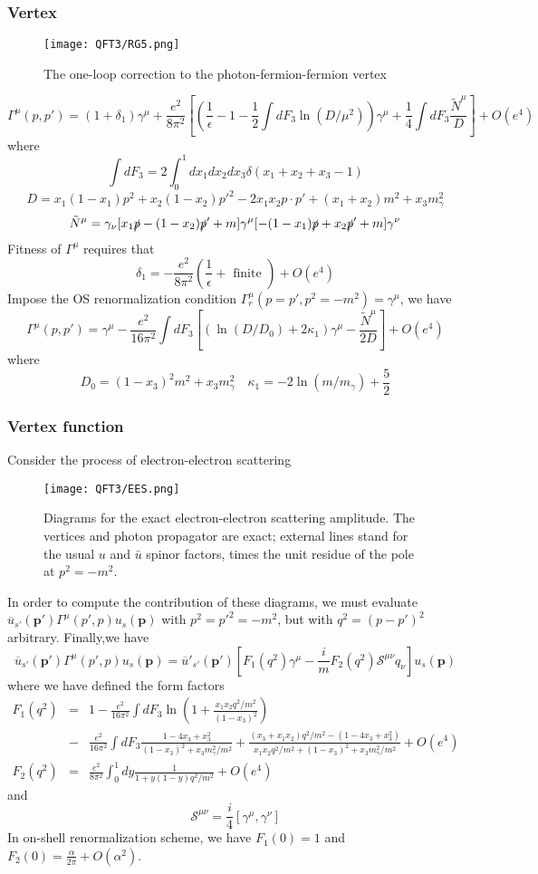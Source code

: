 \subsubsection{Vertex}
\begin{figure}[!h]
\centering
\texttt{[image: QFT3/RG5.png]}
\caption{The one-loop correction to the photon-fermion-fermion vertex}
\end{figure}
\[\Gamma^{\mu}(p,p') = (1+\delta_1)\gamma^{\mu} + \frac{e^2}{8\pi^2} \left[\left(\frac{1}{\epsilon} - 1 - \frac{1}{2} \int dF_3 \ln (D/\mu^2)\right)\gamma^{\mu} + \frac{1}{4} \int dF_3 \frac{\tilde{N}^{\mu}}{D}\right] + O(e^4)\]
where
\[\int dF_3 = 2 \int_0^1 dx_1 dx_2 dx_3 \delta(x_1+x_2+x_3-1)\]
\[D = x_1(1-x_1)p^2 + x_2(1-x_2)p'^2 - 2x_1x_2p \cdot p' + (x_1+x_2)m^2 + x_3 m_{\gamma}^2\]
\[\tilde{N}^{\mu} = \gamma_{\nu}[x_1\slashed{p}-(1-x_2)\slashed{p}'+m]\gamma^{\mu}[-(1-x_1)\slashed{p}+x_2\slashed{p}'+m]\gamma^{\nu}\]
Fitness of $\Gamma^{\mu}$ requires that
\[\delta_1 = -  \frac{e^2}{8\pi^2}(\frac{1}{\epsilon}+\mbox{ finite }) + O(e^4)\]
Impose the OS renormalization condition $\Gamma^{\mu}_r(p=p',p^2=-m^2) = \gamma^{\mu}$, we have
\[\Gamma^{\mu}(p,p') = \gamma^{\mu} - \frac{e^2}{16\pi^2} \int dF_3 \left[\left(\ln (D/D_0)+2\kappa_1\right)\gamma^{\mu} - \frac{\tilde{N}^{\mu}}{2D}\right] + O(e^4)\]
where
\[D_0 = (1-x_3)^2m^2 + x_3 m_{\gamma}^2 \quad \kappa_1 = -2 \ln(m/m_{\gamma}) + \frac{5}{2}\]

\subsubsection{Vertex function}
Consider the process of electron-electron scattering
\begin{figure}[!h]
\centering
\texttt{[image: QFT3/EES.png]}
\caption{Diagrams for the exact electron-electron scattering amplitude. The vertices and photon propagator are exact; external lines stand for the usual $u$ and $\bar{u}$ spinor factors, times the unit residue of the pole at $p^2=-m^2$.}
\end{figure}
In order to compute the contribution of these diagrams, we must evaluate $\overline{u}_{s'}(\bm{p}')\Gamma^{\mu}(p',p)u_s(\bm{p})$ with $p^2 = p'^2 = -m^2$, but with $q^2 = (p-p')^2$ arbitrary. Finally,we have 
\[\overline{u}_{s'}(\bm{p}')\Gamma^{\mu}(p',p)u_s(\bm{p}) = \overline{u}'_{s'}(\bm{p}')\left[F_1(q^2)\gamma^{\mu} - \frac{i}{m}F_2(q^2)\mathcal{S}^{\mu\nu}q_{\nu}\right]u_s(\bm{p})\]
where we have defined the form factors
\begin{eqnarray}
F_1(q^2) &=& 1 - \frac{e^2}{16\pi^2} \int dF_3  \ln \left ( 1 + \frac{x_1x_2q^2/m^2}{(1-x_3)^2}\right ) \nonumber \\
&-& \frac{e^2}{16\pi^2} \int dF_3 \frac{1-4x_3+x_3^2}{(1-x_3)^2+x_3m_{\gamma}^2/m^2} + \frac{(x_3+x_1x_2)q^2/m^2-(1-4x_3+x_3^2)}{x_1x_2q^2/m^2+(1-x_3)^2+x_3m_{\gamma}^2/m^2} + O(e^4) \nonumber \\
F_2(q^2) &=& \frac{e^2}{8\pi^2} \int_0^1 dy \frac{1}{1 + y(1-y)q^2/m^2} + O(e^4) \nonumber
\end{eqnarray}
and
\[\mathcal{S}^{\mu\nu}= \frac{i}{4}[\gamma^{\mu},\gamma^{\nu}]\]
In on-shell renormalization scheme, we have $F_1(0) = 1$ and $F_2(0) = \frac{\alpha}{2\pi} + O(\alpha^2)$.

